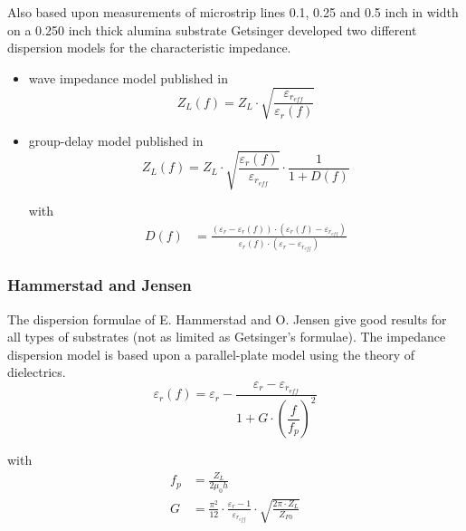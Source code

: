 \documentclass[10pt]{report}
\begin{document}
Also based upon measurements of microstrip lines 0.1, 0.25 and 0.5
inch in width on a 0.250 inch thick alumina substrate Getsinger
\cite{Getsinger2} developed two different dispersion models for the
characteristic impedance.

\begin{itemize}
\item wave impedance model published in \cite{Getsinger2}
\begin{equation}
Z_{L}(f) = Z_{L}\cdot\sqrt{\frac{\varepsilon_{r_{eff}}}{\varepsilon_{r}(f)}}
\end{equation}

\item group-delay model published in \cite{Getsinger3}
\begin{equation}
Z_{L}(f) = Z_{L}\cdot\sqrt{\frac{\varepsilon_{r}(f)}{\varepsilon_{r_{eff}}}}\cdot\frac{1}{1 + D(f)}
\end{equation}

with
\begin{align}
D(f) &= \frac{\left(\varepsilon_{r} - \varepsilon_{r}(f)\right)\cdot\left(\varepsilon_{r}(f) - \varepsilon_{r_{eff}}\right)}{\varepsilon_{r}(f)\cdot\left(\varepsilon_{r} - \varepsilon_{r_{eff}}\right)}
\end{align}
\end{itemize}

\subsubsection{Hammerstad and Jensen}

The dispersion formulae of E. Hammerstad and O. Jensen
\cite{Hammerstad} give good results for all types of substrates (not
as limited as Getsinger's formulae).  The impedance dispersion model
is based upon a parallel-plate model using the theory of dielectrics.
\begin{equation}
\varepsilon_{r}(f) = \varepsilon_{r} - \frac{\varepsilon_{r} - \varepsilon_{r_{eff}}}{1 + G\cdot \left(\dfrac{f}{f_{p}}\right)^{2}}
\end{equation}

with
\begin{align}
f_{p} &= \frac{Z_{L}}{2\mu_{0} h}\\
G &= \frac{\pi^{2}}{12}\cdot\frac{\varepsilon_{r} - 1}{\varepsilon_{r_{eff}}}\cdot\sqrt{\frac{2\pi\cdot Z_{L}}{Z_{F0}}}
\end{align}
\end{document}
